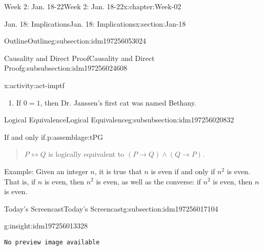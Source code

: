 \documentclass[oneside,10pt,]{book}
\newcommand{\mono}[1]{\texttt{#1}}
\numberwithin{equation}{section}
\newlength{\qrsize}
\newlength{\previewwidth}
\def\imp{\to}
\def\iff{\leftrightarrow}
\renewcommand{\iff}{\leftrightarrow}
\newcommand{\imp}{\rightarrow}
\begin{document}
\begin{chapterptx}{Week 2: Jan. 18-22}{}{Week 2: Jan. 18-22}{}{}{x:chapter:Week-02}
\begin{sectionptx}{Jan. 18: Implications}{}{Jan. 18: Implications}{}{}{x:section:Jan-18}
\begin{subsectionptx}{Outline}{}{Outline}{}{}{g:subsection:idm197256053024}
\begin{subsubsectionptx}{Causality and Direct Proof}{}{Causality and Direct Proof}{}{}{g:subsubsection:idm197256024608}
\begin{activity}{}{x:activity:act-imptf}
\begin{enumerate}
\item{}If \(0=1\), then Dr. Janssen's first cat was named Bethany.%
\end{enumerate}
\end{activity}%
\end{subsubsectionptx}
%
%
\typeout{************************************************}
\typeout{************************************************}
%
\begin{subsubsectionptx}{Logical Equivalence}{}{Logical Equivalence}{}{}{g:subsubsection:idm197256020832}
\begin{assemblage}{If and only if.}{p:assemblage:tPG}%
\begin{quote}%
\(P \iff Q\) is logically equivalent to \((P \imp Q) \wedge (Q \imp P)\).%
\end{quote}
Example: Given an integer \(n\), it is true that \(n\) is even if and only if \(n^2\) is even. That is, if \(n\) is even, then \(n^2\) is even, as well as the converse: if \(n^2\) is even, then \(n\) is even.%
\end{assemblage}
\end{subsubsectionptx}
\end{subsectionptx}
%
%
\typeout{************************************************}
\typeout{************************************************}
%
\begin{subsectionptx}{Today's Screencast}{}{Today's Screencast}{}{}{g:subsection:idm197256017104}
\begin{insight}{}{g:insight:idm197256013328}%
\setlength{\qrsize}{9em}
\setlength{\previewwidth}{\linewidth}
\addtolength{\previewwidth}{-\qrsize}
\begin{tcbraster}[raster columns=2, raster column skip=1pt, raster halign=center, raster force size=false, raster left skip=0pt, raster right skip=0pt]%
\begin{tcolorbox}[previewstyle, width=\previewwidth]%
\mono{No preview image available}%
\end{tcolorbox}%
\begin{tcolorbox}[qrstyle]%
[QR LINK]\end{tcolorbox}%
\end{tcbraster}%
\end{insight}
\end{subsectionptx}
%
%
\typeout{************************************************}
\typeout{************************************************}

\end{sectionptx}
\end{chapterptx}
\end{document}
